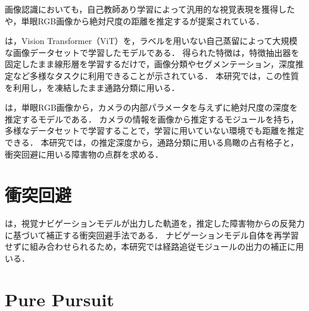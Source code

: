 画像認識においても，自己教師あり学習によって汎用的な視覚表現を獲得した\DINOvTwo \cite{dinov2}や，単眼RGB画像から絶対尺度の距離を推定する\UniDepth \cite{unidepth}が提案されている．

\DINOvTwo は，Vision Transformer（ViT）\cite{vit}を，ラベルを用いない自己蒸留によって大規模な画像データセットで学習したモデルである\cite{dinov2}．
得られた特徴は，特徴抽出器を固定したまま線形層を学習するだけで，画像分類やセグメンテーション，深度推定など多様なタスクに利用できることが示されている．
本研究では，この性質を利用し，\DINOvTwo を凍結したまま通路分類に用いる．

\UniDepth は，単眼RGB画像から，カメラの内部パラメータを与えずに絶対尺度の深度を推定するモデルである\cite{unidepth}．
カメラの情報を画像から推定するモジュールを持ち，多様なデータセットで学習することで，学習に用いていない環境でも距離を推定できる．
本研究では，\UniDepth の推定深度から，通路分類に用いる鳥瞰の占有格子と，衝突回避に用いる障害物の点群を求める．

\section{衝突回避}
\label{sec:related_care}

\CARE は，視覚ナビゲーションモデルが出力した軌道を，推定した障害物からの反発力に基づいて補正する衝突回避手法である\cite{care}．
ナビゲーションモデル自体を再学習せずに組み合わせられるため，本研究では経路追従モジュールの出力の補正に用いる．

\section{Pure Pursuit}
\label{sec:pure_pursuit}

